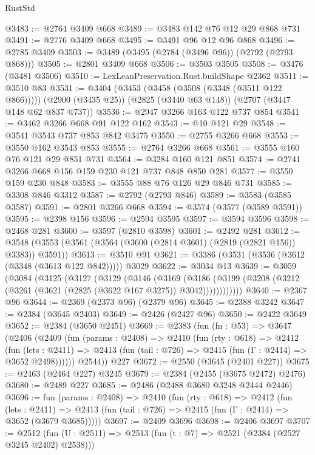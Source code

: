 \begin{lexlean}{RustStd}
\begin{coremodule}
@3483 := @2764 @3409 @668
@3489 := @3483 @142 @76 @12 @29 @868 @731
@3491 := @2776 @3409 @668
@3495 := @3491 @96 @12 @96 @868
@3496 := @2785 @3409
@3503 := @3489 (@3495 (@2784 (@3496 @96)) (@2792 (@2793 @868)))
@3505 := @2801 @3409 @668
@3506 := @3503 @3505
@3508 := @3476 (@3481 @3506)
@3510 := LexLeanPreservation.Rust.buildShape @2362
@3511 := @3510 @83
@3531 := @3404
    (@3453 (@3458 (@3508 (@3348 (@3511 @122 @866)))))
    (@2900 (@3435 @25))
    (@2825 (@3440 @63 @148))
    (@2707 (@3447 @148 @62 @837 @737))
@3536 := @2947 @3266 @163 @122 @737 @854
@3541 := @3462 @3266 @668 @91 @122 @162
@3543 := @10 @121 @29
@3548 := @3541 @3543 @737 @853 @842 @3475
@3550 := @2755 @3266 @668
@3553 := @3550 @162 @3543 @853
@3555 := @2764 @3266 @668
@3561 := @3555 @160 @76 @121 @29 @851 @731
@3564 := @3284 @160 @121 @851
@3574 := @2741 @3266 @668 @156 @159 @230 @121 @737 @848 @850 @281
@3577 := @3550 @159 @230 @848
@3583 := @3555 @88 @76 @126 @29 @846 @731
@3585 := @3308 @846 @3312
@3587 := @2792 (@2793 @846)
@3589 := @3583 (@3585 @3587)
@3591 := @2801 @3266 @668
@3594 := @3574 (@3577 (@3589 @3591))
@3595 := @2398 @156
@3596 := @2594 @3595
@3597 := @3594 @3596
@3598 := @2468 @281
@3600 := @3597 (@2810 @3598)
@3601 := @2492 @281
@3612 := @3548 (@3553 (@3561 (@3564 (@3600 (@2814 @3601) (@2819 (@2821 @156)) @3383)) @3591))
@3613 := @3510 @91
@3621 := @3386 (@3531 (@3536 (@3612 (@3348 (@3613 @122 @842))))) @3029
@3622 := @3034 @13
@3639 := @3059
    (@3084
      (@3125
        (@3127
          (@3129
            (@3146
              (@3169
                (@3186
                  (@3199 (@3208 (@3212 (@3261 (@3621 (@2825 (@3622 @167 @3275)) @3042))))))))))))
@3640 := @2367 @96
@3644 := @2369 (@2373 @96) (@2379 @96)
@3645 := @2388 @3242
@3647 := @2384 (@3645 @2403)
@3649 := @2426 (@2427 @96)
@3650 := @2422 @3649
@3652 := @2384 (@3650 @2451)
@3669 := @2383
    (fun (fn : @53) =>
    @3647
      (@2406
        (@2409
          (fun (params : @2408) =>
          @2410
            (fun (rty : @618) =>
            @2412
              (fun (lets : @2411) =>
              @2413 (fun (tail : @726) => @2415 (fun (Γ : @2414) => @3652 @2498))))))
        @2544))
    @227
@3672 := @2550 (@3645 (@2401 @227))
@3675 := @2463 (@2464 @227) @3245
@3679 := @2384 (@2455 (@3675 @2472) @2476)
@3680 := @2489 @227
@3685 := @2486 (@2488 @3680 @3248 @2444 @2446)
@3696 := fun (params : @2408) =>
  @2410
    (fun (rty : @618) =>
    @2412
      (fun (lets : @2411) =>
      @2413 (fun (tail : @726) => @2415 (fun (Γ : @2414) => @3652 (@3679 @3685)))))
@3697 := @2409 @3696
@3698 := @2406 @3697
@3707 := @2512 (fun (U : @2511) => @2513 (fun (t : @7) => @2521 (@2384 (@2527 @3245 @2402) @2538)))

\end{coremodule}
\end{lexlean}
